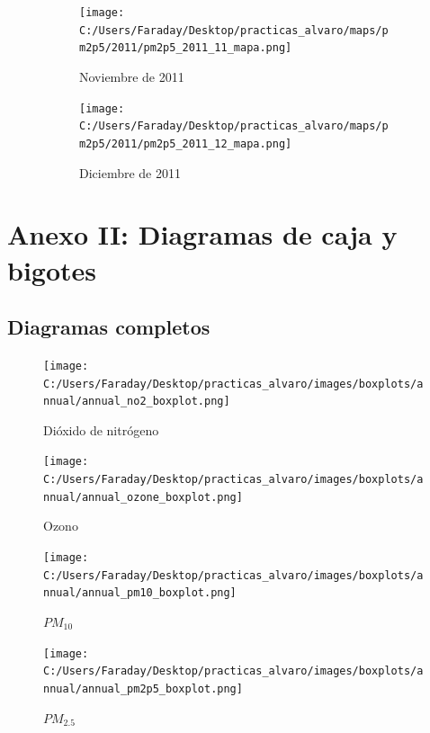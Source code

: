 \documentclass[12pt]{article}
\begin{document}
\begin{figure}[H]
\centering
\begin{subfigure}[h]{0.45\textwidth}
\texttt{[image: C:/Users/Faraday/Desktop/practicas\_alvaro/maps/pm2p5/2011/pm2p5\_2011\_11\_mapa.png]}
\caption{Noviembre de 2011}
\label{fig:map-mon-4-11-2011}
\end{subfigure}
%
\begin{subfigure}[H]{0.45\textwidth}
\texttt{[image: C:/Users/Faraday/Desktop/practicas\_alvaro/maps/pm2p5/2011/pm2p5\_2011\_12\_mapa.png]}
\caption{Diciembre de 2011}
\label{fig:map-mon-4-12-2011}
\end{subfigure}
\caption{}
\end{figure}

\newpage

\section*{Anexo II: Diagramas de caja y bigotes}
%

\subsection*{Diagramas completos}
%

\begin{figure}[H]
\texttt{[image: C:/Users/Faraday/Desktop/practicas\_alvaro/images/boxplots/annual/annual\_no2\_boxplot.png]}
\caption{Dióxido de nitrógeno}
\label{fig:box-com-1}
\end{figure}

\begin{figure}[H]
\texttt{[image: C:/Users/Faraday/Desktop/practicas\_alvaro/images/boxplots/annual/annual\_ozone\_boxplot.png]}
\caption{Ozono}
\label{fig:box-com-2}
\end{figure}

\newpage

\begin{figure}[H]
\texttt{[image: C:/Users/Faraday/Desktop/practicas\_alvaro/images/boxplots/annual/annual\_pm10\_boxplot.png]}
\caption{$PM_{10}$}
\label{fig:box-com-3}
\end{figure}

\begin{figure}[H]
\texttt{[image: C:/Users/Faraday/Desktop/practicas\_alvaro/images/boxplots/annual/annual\_pm2p5\_boxplot.png]}
\caption{$PM_{2.5}$}
\label{fig:box-com-4}
\end{figure}
\end{document}
